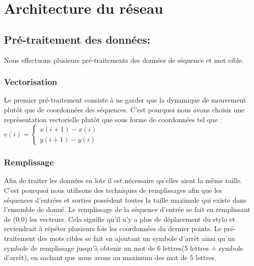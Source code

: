 \newpage
\section{Architecture du réseau}

\subsection{Pré-traitement des données:}
    Nous effectuons plusieurs pré-traitements des données de séquence et mot cible.
    \subsubsection{Vectorisation}
        Le premier pré-traitement consiste à ne garder que la dynamique de mouvement plutôt que de coordonnées des séquences. C'est pourquoi nous avons choisis une représentation vectorielle plutôt que sous forme de coordonnées tel que :
        $v(i)=\left\{\begin{array}{l}x(i+1)-x(i) \\ y(i+1)-y(i)\end{array}\right.$
    
    \subsubsection{Remplissage}
        Afin de traiter les données en lots il est nécessaire qu'elles aient la même taille. C'est pourquoi nous utilisons des techniques de remplissages afin que les séquences d'entrées et sorties possèdent toutes la taille maximale qui existe dans l'ensemble de donné.
        \newline 
        Le remplissage de la séquence d'entrée se fait en remplissant de (0,0) les vecteurs. Cela signifie qu'il n'y a plus de déplacement du stylo et reviendrait à répéter plusieurs fois les coordonnées du dernier points. 
        \newline
        Le pré-traitement des mots cibles se fait en ajoutant un symbole d'arrêt ainsi qu'un symbole de remplissage jusqu'à obtenir un mot de 6 lettres(5 lettres + symbole d'arrêt), en sachant que nous avons au maximum des mot de 5 lettres.

